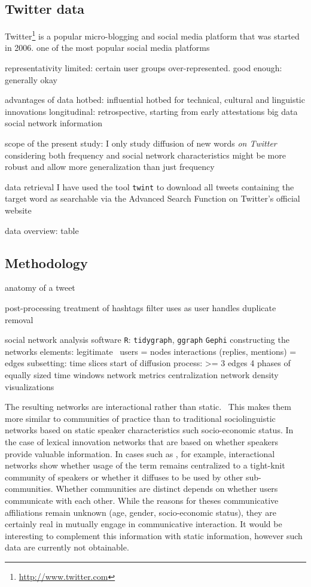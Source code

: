 \documentclass[draft, a4paper, abstract=on]{scrartcl}
\newcommand{\sw}[1]{\texttt{#1}}
\begin{document}
  \subsection{Twitter data}

Twitter\footnote{\url{http://www.twitter.com}} is a popular micro-blogging and social media platform that was started in 2006.
one of the most popular social media platforms

representativity
limited: certain user groups over-represented.
good enough: generally okay \parencite{Grieve2019MappingLexical}

advantages of data
hotbed: influential hotbed for technical, cultural and linguistic innovations
longitudinal: retrospective, starting from early attestations
big data
social network information

scope of the present study:
I only study diffusion of new words \emph{on Twitter}
considering both frequency and social network characteristics might be more robust and allow more generalization than just frequency

data retrieval
I have used the tool \sw{twint}
to download all tweets containing the target word
as searchable via the Advanced Search Function on Twitter's official website

data overview: table

  \subsection{Methodology}

anatomy of a tweet

post-processing
treatment of hashtags
filter uses as user handles
duplicate removal

social network analysis
software
\sw{R}: \sw{tidygraph}, \sw{ggraph}
\sw{Gephi}
constructing the networks
elements: legitimate~\parencite{Goel2016SocialDynamics}
users = nodes
interactions (replies, mentions) = edges
subsetting: time slices
start of diffusion process: >= 3 edges
4 phases of equally sized time windows
network metrics
centralization
network density
visualizations

The resulting networks are interactional rather than static.~\parencite{Goel2016SocialDynamics} This makes them more similar to communities of practice than to traditional sociolinguistic networks based on static speaker characteristics such socio-economic status.
In the case of lexical innovation networks that are based on whether speakers provide valuable information. In cases such as , for example, interactional networks show whether usage of the term remains centralized to a tight-knit community of speakers or whether it diffuses to be used by other sub-communities.
Whether communities are distinct depends on whether users communicate with each other. While the reasons for theses communicative affiliations remain unknown (age, gender, socio-economic status), they are certainly real in mutually engage in communicative interaction.
It would be interesting to complement this information with static information, however such data are currently not obtainable.
\end{document}

